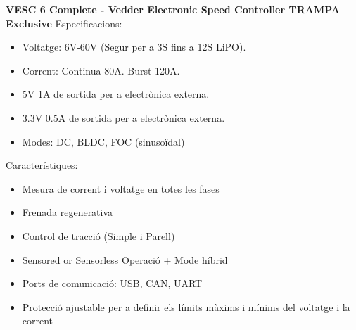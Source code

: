 
\textbf{VESC 6 Complete - Vedder Electronic Speed Controller TRAMPA Exclusive}\smallskip
Especificacions:
\begin{itemize}
	\item Voltatge: 6V-60V (Segur per a 3S fins a 12S LiPO).
	\item Corrent: Continua 80A. Burst 120A. 
	\item 5V 1A de sortida per a electrònica externa.
	\item 3.3V 0.5A de sortida per a electrònica externa.
	\item Modes: DC, BLDC, FOC (sinusoïdal)
\end{itemize} 
Característiques:
\begin{itemize}
	\item Mesura de corrent i voltatge en totes les fases
	\item Frenada regenerativa
	\item Control de tracció (Simple i Parell)
	\item Sensored or Sensorless Operació + Mode híbrid
	\item Ports de comunicació: USB, CAN, UART
	\item Protecció ajustable per a definir els límits màxims i mínims \newline del voltatge i la corrent
\end{itemize}
